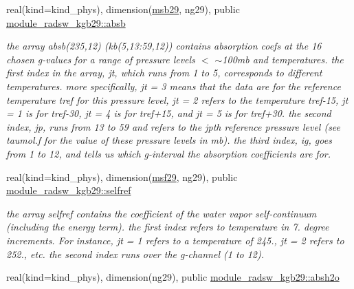 \begin{DoxyCompactItemize}
\mbox{\label{group__module__radsw__kgbnn_gac9fb794bc4e4a02964b5e5d1431c31c3}} 
real(kind=kind\+\_\+phys), dimension(\hyperlink{group__module__radsw__kgbnn_gadd8e18a273d5fa133f22fb47c4d722da}{msb29}, ng29), public \hyperlink{group__module__radsw__kgbnn_gac9fb794bc4e4a02964b5e5d1431c31c3}{module\+\_\+radsw\+\_\+kgb29\+::absb}
\begin{DoxyCompactList}\small\item\em the array absb(235,12) (kb(5,13\+:59,12)) contains absorption coefs at the 16 chosen g-\/values for a range of pressure levels $<$ $\sim$100mb and temperatures. the first index in the array, jt, which runs from 1 to 5, corresponds to different temperatures. more specifically, jt = 3 means that the data are for the reference temperature tref for this pressure level, jt = 2 refers to the temperature tref-\/15, jt = 1 is for tref-\/30, jt = 4 is for tref+15, and jt = 5 is for tref+30. the second index, jp, runs from 13 to 59 and refers to the jpth reference pressure level (see taumol.\+f for the value of these pressure levels in mb). the third index, ig, goes from 1 to 12, and tells us which g-\/interval the absorption coefficients are for. \end{DoxyCompactList}\item 
\mbox{\label{group__module__radsw__kgbnn_ga468e2dd6001734d10784c8fb7b5df4e3}} 
real(kind=kind\+\_\+phys), dimension(\hyperlink{group__module__radsw__kgbnn_gace849342fcb0d18d825318a2ee26ce0e}{msf29}, ng29), public \hyperlink{group__module__radsw__kgbnn_ga468e2dd6001734d10784c8fb7b5df4e3}{module\+\_\+radsw\+\_\+kgb29\+::selfref}
\begin{DoxyCompactList}\small\item\em the array selfref contains the coefficient of the water vapor self-\/continuum (including the energy term). the first index refers to temperature in 7. degree increments. For instance, jt = 1 refers to a temperature of 245., jt = 2 refers to 252., etc. the second index runs over the g-\/channel (1 to 12). \end{DoxyCompactList}\item 
\mbox{\label{group__module__radsw__kgbnn_gacab70725ca7faf002f04306fe1798e02}} 
real(kind=kind\+\_\+phys), dimension(ng29), public \hyperlink{group__module__radsw__kgbnn_gacab70725ca7faf002f04306fe1798e02}{module\+\_\+radsw\+\_\+kgb29\+::absh2o}

\end{DoxyCompactItemize}
